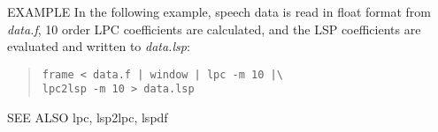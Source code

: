 \begin{qsection}{EXAMPLE}
In the following example, speech data is read in float format from
{\em data.f}, 10 order LPC coefficients are calculated,
and the LSP coefficients are evaluated and written to {\em data.lsp}:
\begin{quote}
\verb!frame < data.f | window | lpc -m 10 |\!\\
\verb!lpc2lsp -m 10 > data.lsp!
\end{quote}
\end{qsection}

\begin{qsection}{SEE ALSO}
lpc, lsp2lpc, lspdf
\end{qsection}
